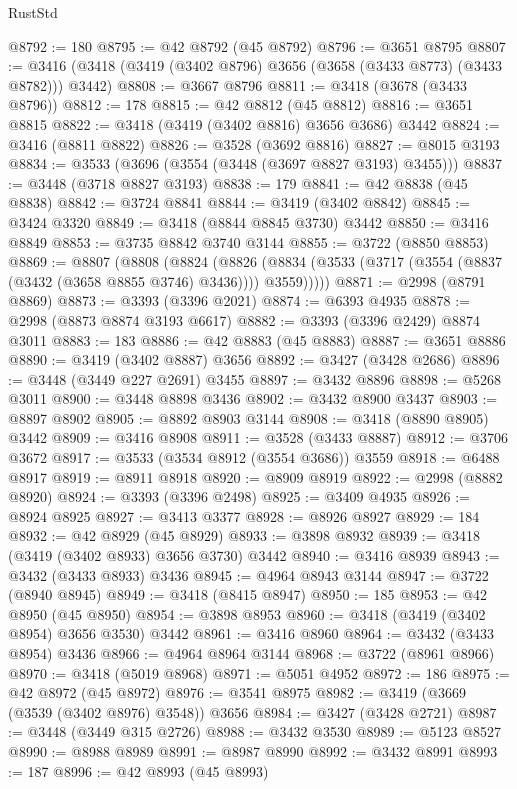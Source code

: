 \begin{lexlean}{RustStd}
\begin{coremodule}
@8792 := 180
@8795 := @42 @8792 (@45 @8792)
@8796 := @3651 @8795
@8807 := @3416 (@3418 (@3419 (@3402 @8796) @3656 (@3658 (@3433 @8773) (@3433 @8782))) @3442)
@8808 := @3667 @8796
@8811 := @3418 (@3678 (@3433 @8796))
@8812 := 178
@8815 := @42 @8812 (@45 @8812)
@8816 := @3651 @8815
@8822 := @3418 (@3419 (@3402 @8816) @3656 @3686) @3442
@8824 := @3416 (@8811 @8822)
@8826 := @3528 (@3692 @8816)
@8827 := @8015 @3193
@8834 := @3533 (@3696 (@3554 (@3448 (@3697 @8827 @3193) @3455)))
@8837 := @3448 (@3718 @8827 @3193)
@8838 := 179
@8841 := @42 @8838 (@45 @8838)
@8842 := @3724 @8841
@8844 := @3419 (@3402 @8842)
@8845 := @3424 @3320
@8849 := @3418 (@8844 @8845 @3730) @3442
@8850 := @3416 @8849
@8853 := @3735 @8842 @3740 @3144
@8855 := @3722 (@8850 @8853)
@8869 := @8807
    (@8808
      (@8824
        (@8826 (@8834 (@3533 (@3717 (@3554 (@8837 (@3432 (@3658 @8855 @3746) @3436)))) @3559)))))
@8871 := @2998 (@8791 @8869)
@8873 := @3393 (@3396 @2021)
@8874 := @6393 @4935
@8878 := @2998 (@8873 @8874 @3193 @6617)
@8882 := @3393 (@3396 @2429) @8874 @3011
@8883 := 183
@8886 := @42 @8883 (@45 @8883)
@8887 := @3651 @8886
@8890 := @3419 (@3402 @8887) @3656
@8892 := @3427 (@3428 @2686)
@8896 := @3448 (@3449 @227 @2691) @3455
@8897 := @3432 @8896
@8898 := @5268 @3011
@8900 := @3448 @8898 @3436
@8902 := @3432 @8900 @3437
@8903 := @8897 @8902
@8905 := @8892 @8903 @3144
@8908 := @3418 (@8890 @8905) @3442
@8909 := @3416 @8908
@8911 := @3528 (@3433 @8887)
@8912 := @3706 @3672
@8917 := @3533 (@3534 @8912 (@3554 @3686)) @3559
@8918 := @6488 @8917
@8919 := @8911 @8918
@8920 := @8909 @8919
@8922 := @2998 (@8882 @8920)
@8924 := @3393 (@3396 @2498)
@8925 := @3409 @4935
@8926 := @8924 @8925
@8927 := @3413 @3377
@8928 := @8926 @8927
@8929 := 184
@8932 := @42 @8929 (@45 @8929)
@8933 := @3898 @8932
@8939 := @3418 (@3419 (@3402 @8933) @3656 @3730) @3442
@8940 := @3416 @8939
@8943 := @3432 (@3433 @8933) @3436
@8945 := @4964 @8943 @3144
@8947 := @3722 (@8940 @8945)
@8949 := @3418 (@8415 @8947)
@8950 := 185
@8953 := @42 @8950 (@45 @8950)
@8954 := @3898 @8953
@8960 := @3418 (@3419 (@3402 @8954) @3656 @3530) @3442
@8961 := @3416 @8960
@8964 := @3432 (@3433 @8954) @3436
@8966 := @4964 @8964 @3144
@8968 := @3722 (@8961 @8966)
@8970 := @3418 (@5019 @8968)
@8971 := @5051 @4952
@8972 := 186
@8975 := @42 @8972 (@45 @8972)
@8976 := @3541 @8975
@8982 := @3419 (@3669 (@3539 (@3402 @8976) @3548)) @3656
@8984 := @3427 (@3428 @2721)
@8987 := @3448 (@3449 @315 @2726)
@8988 := @3432 @3530
@8989 := @5123 @8527
@8990 := @8988 @8989
@8991 := @8987 @8990
@8992 := @3432 @8991
@8993 := 187
@8996 := @42 @8993 (@45 @8993)

\end{coremodule}
\end{lexlean}
